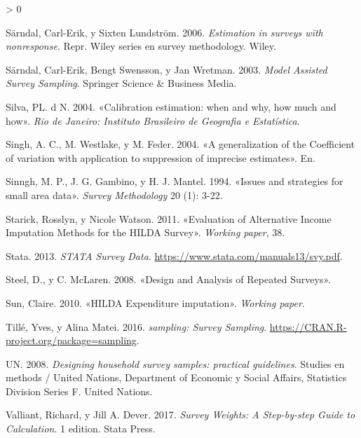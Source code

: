 \documentclass[
  12pt,
  spanish,
]{book}
\newlength{\cslhangindent}
\newenvironment{CSLReferences}[2] %
 {%
  \setlength{\parindent}{0pt}
  \ifodd #1 \everypar{\setlength{\hangindent}{\cslhangindent}}\ignorespaces\fi
  \ifnum #2 > 0
  \setlength{\parskip}{#2\baselineskip}
  \fi
 }%
 {}
\begin{document}
\begin{CSLReferences}{1}{0}
\leavevmode\hypertarget{ref-Sarndal_Lundstrom_2006}{}%
Särndal, Carl-Erik, y Sixten Lundström. 2006. \emph{Estimation in surveys with nonresponse}. Repr. Wiley series en survey methodology. Wiley.

\leavevmode\hypertarget{ref-Sarndal_Swensson_Wretman_2003}{}%
Särndal, Carl-Erik, Bengt Swensson, y Jan Wretman. 2003. \emph{Model Assisted Survey Sampling}. Springer Science \& Business Media.

\leavevmode\hypertarget{ref-Silva_2004}{}%
Silva, PL. d N. 2004. {«Calibration estimation: when and why, how much and how»}. \emph{Rio de Janeiro: Instituto Brasileiro de Geografia e Estatística}.

\leavevmode\hypertarget{ref-Singh_Westlake_Feder_2004}{}%
Singh, A. C., M. Westlake, y M. Feder. 2004. {«A generalization of the Coefficient of variation with application to suppression of imprecise estimates»}. En.

\leavevmode\hypertarget{ref-Sinngh_Gambino_Mantel_1994}{}%
Sinngh, M. P., J. G. Gambino, y H. J. Mantel. 1994. {«Issues and strategies for small area data»}. \emph{Survey Methodology} 20 (1): 3-22.

\leavevmode\hypertarget{ref-Starick_Watson_2011}{}%
Starick, Rosslyn, y Nicole Watson. 2011. {«Evaluation of Alternative Income Imputation Methods for the HILDA Survey»}. \emph{Working paper}, 38.

\leavevmode\hypertarget{ref-STATA_2017}{}%
Stata. 2013. \emph{STATA Survey Data}. \url{https://www.stata.com/manuals13/svy.pdf}.

\leavevmode\hypertarget{ref-Steel_McLaren_2008}{}%
Steel, D., y C. McLaren. 2008. {«Design and Analysis of Repeated Surveys»}.

\leavevmode\hypertarget{ref-Sun_2010}{}%
Sun, Claire. 2010. {«HILDA Expenditure imputation»}. \emph{Working paper}.

\leavevmode\hypertarget{ref-Yves}{}%
Tillé, Yves, y Alina Matei. 2016. \emph{sampling: Survey Sampling}. \url{https://CRAN.R-project.org/package=sampling}.

\leavevmode\hypertarget{ref-United_Nations_2008}{}%
UN. 2008. \emph{Designing household survey samples: practical guidelines}. Studies en methods / United Nations, Department of Economic y Social Affairs, Statistics Division Series F. United Nations.

\leavevmode\hypertarget{ref-Valliant_Dever_2017}{}%
Valliant, Richard, y Jill A. Dever. 2017. \emph{Survey Weights: A Step-by-step Guide to Calculation}. 1 edition. Stata Press.


\end{CSLReferences}
\end{document}
